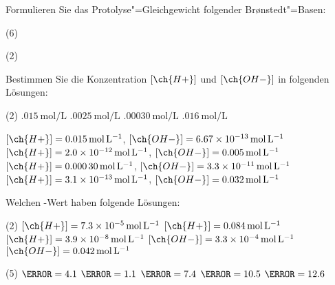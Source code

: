 \documentclass{arbeitsblatt}
\begin{document}
\begin{question}
  Formulieren Sie das Protolyse"=Gleichgewicht folgender Br\o nstedt"=Basen:
  \begin{tasks}(6)
    \task {}
    \task {}
    \task {}
    \task {}
    \task {}
    \task {}
  \end{tasks}
\end{question}
\begin{solution}
  \begin{tasks}(2)
    \task {}
    \task {}
    \task {}
    \task {}
    \task {}
    \task {}
  \end{tasks}
\end{solution}

\begin{question}
  Bestimmen Sie die Konzentration \([\ch{H+}]\) und \([\ch{OH-}]\) in folgenden
  Lösungen:
  \begin{tasks}(2)
    \task $\SI{.015}{\mole\per\liter}$ 
    \task $\SI{.0025}{\mole\per\liter}$ 
    \task $\SI{.00030}{\mole\per\liter}$ 
    \task $\SI{.016}{\mole\per\liter}$ 
  \end{tasks}
\end{question}
\begin{solution}
  \begin{tasks}
    \task $[\ch{H+}] = \SI{.015}{\mole\per\liter}$, $[\ch{OH-}] =
      \SI{6.67e-13}{\mole\per\liter}$
    \task $[\ch{H+}] = \SI{2.0e-12}{\mole\per\liter}$, $[\ch{OH-}] =
      \SI{.005}{\mole\per\liter}$
    \task $[\ch{H+}] = \SI{.00030}{\mole\per\liter}$, $[\ch{OH-}] =
      \SI{3.3e-11}{\mole\per\liter}$
    \task $[\ch{H+}] = \SI{3.1e-13}{\mole\per\liter}$, $[\ch{OH-}] =
      \SI{.032}{\mole\per\liter}$
  \end{tasks}
\end{solution}

\begin{question}
  Welchen \pH-Wert haben folgende Lösungen:
  \begin{tasks}(2)
    \task \([\ch{H+}] = \SI{7.3e-5}{\mole\per\liter}\)
    \task \([\ch{H+}] = \SI{.084}{\mole\per\liter}\)
    \task \([\ch{H+}] = \SI{3.9e-8}{\mole\per\liter}\)
    \task \([\ch{OH-}] = \SI{3.3e-4}{\mole\per\liter}\)
    \task \([\ch{OH-}] = \SI{.042}{\mole\per\liter}\)
  \end{tasks}
\end{question}
\begin{solution}
  \begin{tasks}(5)
    \task $\pH = 4.1$
    \task $\pH = 1.1$
    \task $\pH = 7.4$
    \task $\pH = 10.5$
    \task $\pH = 12.6$
  \end{tasks}
\end{solution}
\end{document}
